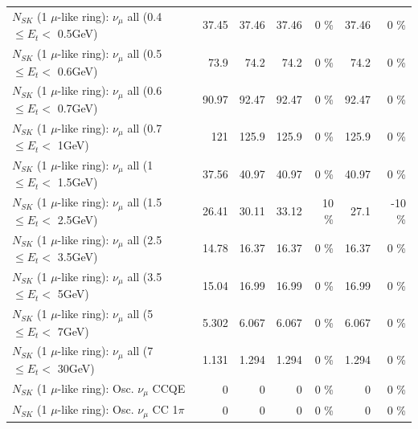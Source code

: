 \begin{table}
\begin{tabular}{| l | r | r | r  r | r  r |}
       $N_{SK}$ (1 $\mu$-like ring): $\nu_{\mu}$ all (0.4 $\leq E_{t} <$ 0.5GeV) &           37.45 &           37.46 &           37.46 &        0 \%  &           37.46 &        0 \%  \\ 
       $N_{SK}$ (1 $\mu$-like ring): $\nu_{\mu}$ all (0.5 $\leq E_{t} <$ 0.6GeV) &            73.9 &            74.2 &            74.2 &        0 \%  &            74.2 &        0 \%  \\ 
       $N_{SK}$ (1 $\mu$-like ring): $\nu_{\mu}$ all (0.6 $\leq E_{t} <$ 0.7GeV) &           90.97 &           92.47 &           92.47 &        0 \%  &           92.47 &        0 \%  \\ 
         $N_{SK}$ (1 $\mu$-like ring): $\nu_{\mu}$ all (0.7 $\leq E_{t} <$ 1GeV) &             121 &           125.9 &           125.9 &        0 \%  &           125.9 &        0 \%  \\ 
         $N_{SK}$ (1 $\mu$-like ring): $\nu_{\mu}$ all (1 $\leq E_{t} <$ 1.5GeV) &           37.56 &           40.97 &           40.97 &        0 \%  &           40.97 &        0 \%  \\ 
       $N_{SK}$ (1 $\mu$-like ring): $\nu_{\mu}$ all (1.5 $\leq E_{t} <$ 2.5GeV) &           26.41 &           30.11 &           33.12 &       10 \%  &            27.1 &      -10 \%  \\ 
       $N_{SK}$ (1 $\mu$-like ring): $\nu_{\mu}$ all (2.5 $\leq E_{t} <$ 3.5GeV) &           14.78 &           16.37 &           16.37 &        0 \%  &           16.37 &        0 \%  \\ 
         $N_{SK}$ (1 $\mu$-like ring): $\nu_{\mu}$ all (3.5 $\leq E_{t} <$ 5GeV) &           15.04 &           16.99 &           16.99 &        0 \%  &           16.99 &        0 \%  \\ 
           $N_{SK}$ (1 $\mu$-like ring): $\nu_{\mu}$ all (5 $\leq E_{t} <$ 7GeV) &           5.302 &           6.067 &           6.067 &        0 \%  &           6.067 &        0 \%  \\ 
          $N_{SK}$ (1 $\mu$-like ring): $\nu_{\mu}$ all (7 $\leq E_{t} <$ 30GeV) &           1.131 &           1.294 &           1.294 &        0 \%  &           1.294 &        0 \%  \\ 
\hline
\hline
                               $N_{SK}$ (1 $\mu$-like ring): Osc. $\nu_\mu$ CCQE &               0 &               0 &               0 &        0 \%  &               0 &        0 \%  \\ 
                          $N_{SK}$ (1 $\mu$-like ring): Osc. $\nu_\mu$ CC 1$\pi$ &               0 &               0 &               0 &        0 \%  &               0 &        0 \%  \\ 

\end{tabular}
\end{table}
